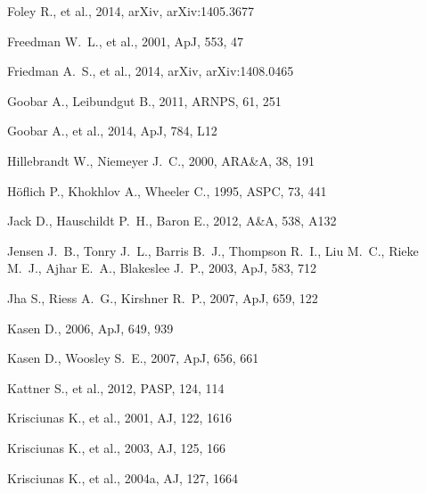 \begin{thebibliography}{99}
 Foley R., et al., 2014, arXiv, 
arXiv:1405.3677

 Freedman W.~L., et al., 2001, ApJ, 553, 47 

 Friedman A.~S., et al., 2014, arXiv, 
arXiv:1408.0465 

 Goobar A., Leibundgut B., 2011, ARNPS, 61, 251

Goobar A., et al., 2014, ApJ, 784, L12 


 Hillebrandt W., Niemeyer J.~C., 2000, ARA\&A, 38, 191 

 H\" oflich P., Khokhlov A., Wheeler C.,
1995, ASPC, 73, 441 


 Jack D., Hauschildt P.~H., Baron E., 2012, A\&A, 538, A132 

 Jensen J.~B., Tonry J.~L., Barris
B.~J., Thompson R.~I., Liu M.~C., Rieke M.~J., Ajhar E.~A., Blakeslee
J.~P., 2003, ApJ, 583, 712 

 Jha S., Riess A.~G., Kirshner R.~P., 2007, ApJ, 659, 122 

 Kasen 
D., 2006, ApJ, 649, 939

 Kasen D., Woosley S.~E., 2007, ApJ, 656, 661 
 
 Kattner S., et al., 2012, PASP, 124, 114 

 Krisciunas K., et al., 2001, AJ, 122, 1616 

 Krisciunas K., et al., 2003, AJ, 125, 166 

 Krisciunas K., et al., 2004a, AJ, 127, 1664 


\end{thebibliography}
